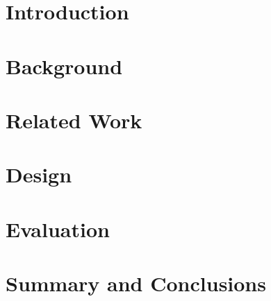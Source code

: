 \documentclass[a4paper,12pt,twoside,openright]{report}
\begin{document}
\pagestyle{empty}
\singlespacing
{}

\restoregeometry
\onehalfspacing

\singlespacing


\setcounter{page}{0}
\pagestyle{plain}
\tableofcontents
\listoffigures
\listoftables

\onehalfspacing

\raggedbottom

\chapter{Introduction}
\setcounter{page}{1} 


\chapter{Background} 
\label{sec:background}


\chapter{Related Work} 
\label{sec:related}


\chapter{Design}
\label{sec:design}


\chapter{Evaluation} 
\label{sec:eval}


\chapter{Summary and Conclusions}
\label{sec:conclusion}



\appendix
\singlespacing







 
 

\end{document}
